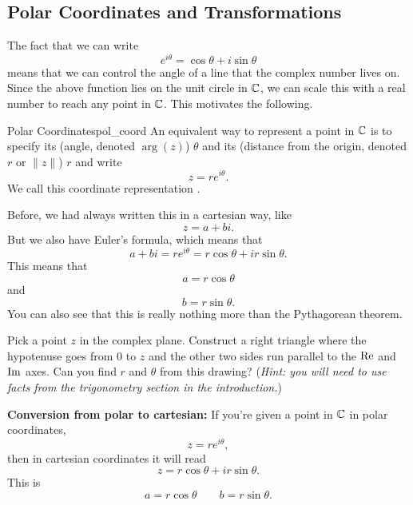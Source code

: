         \subsection{Polar Coordinates and Transformations}
        The fact that we can write
        \[
        e^{i\theta}= \cos \theta + i \sin \theta
        \]
        means that we can control the angle of a line that the complex number lives on.  Since the above function lies on the unit circle in $\mathbb{C}$, we can scale this with a real number to reach any point in $\mathbb{C}$. This motivates the following.
        
        \begin{df}{Polar Coordinates}{pol_coord}
        An equivalent way to represent a point in $\mathbb{C}$ is to specify its  (angle, denoted $\arg(z)$) $\theta$ and its  (distance from the origin, denoted $r$ or $\|z\|$) $r$ and write
        \[
        z=re^{i\theta}.
        \]
        We call this coordinate representation . 
        \end{df}
        
        Before, we had always written this in a cartesian way, like
        \[
        z=a+bi.
        \]
        But we also have Euler's formula, which means that
        \[
        a+bi = re^{i\theta} = r\cos \theta + i r \sin \theta.
        \]
        This means that
        \[
        a=r\cos \theta
        \]
        and 
        \[
        b = r \sin \theta.
        \]
        You can also see that this is really nothing more than the Pythagorean theorem.
        
        \begin{exercise}
            Pick a point $z$ in the complex plane. Construct a right triangle where the hypotenuse goes from $0$ to $z$ and the other two sides run parallel to the $\mathrm{Re}$ and $\mathrm{Im}$ axes. Can you find $r$ and $\theta$ from this drawing? (\emph{Hint: you will need to use facts from the trigonometry section in the introduction.})
        \end{exercise}
        
        
        
        \noindent \textbf{\textbf{Conversion from polar to cartesian:}} If you're given a point in $\mathbb{C}$ in polar coordinates,
        \[
        z=re^{i\theta},
        \]
        then in cartesian coordinates it will read
        \[
        z=r\cos \theta + ir\sin \theta.
        \]
        This is
        \[
        a=r\cos \theta \qquad b=r\sin \theta.
        \]
        
